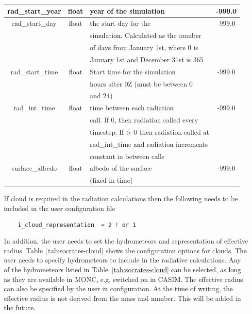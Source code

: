 \documentclass[a4paper,11pt]{article}
\begin{document}
\begin{table}[H]
\begin{tabular}{|c|c|l|c|}
\hline
  rad\_start\_year & float &year of the simulation  & -999.0 \tabularnewline
\hline
  rad\_start\_day & float & the start day for the & -999.0 \tabularnewline
   &  & simulation. Calculated as the number & \tabularnewline
   &  & of days from January 1st, where 0 is & \tabularnewline
   &  & January 1st and December 31st is 365 & \tabularnewline
\hline
  rad\_start\_time & float & Start time for the simulation & -999.0 \tabularnewline
   &  & hours after 0Z (must be between 0 & \tabularnewline
   &  & and 24) & \tabularnewline
\hline
  rad\_int\_time & float & time between each radiation & -999.0 \tabularnewline
   &  & call. If 0, then radiation called every & \tabularnewline
   &  & timestep. If > 0 then radiation called at & \tabularnewline
   &  & rad\_int\_time and radiation increments & \tabularnewline
   &  & constant in between calls & \tabularnewline
\hline
  surface\_albedo & float & albedo of the surface & -999.0 \tabularnewline
   &  & (fixed in time) & \tabularnewline
\hline
\hline
\end{tabular}
\end{table}

If cloud is required in the radiation calculations then the following needs to
be included in the user configuration file
\begin{lstlisting}
    i_cloud_representation  = 2 ! or 1
\end{lstlisting}
In addition, the user needs to set the hydrometeors and representation of
effective radius. Table~\ref{tab:socrates-cloud} shows the configuration
options for clouds. The user needs to specify hydrometeors to include in the
radiative calculations. Any of the hydrometeors listed in Table~\ref{tab:socrates-cloud}
can be selected, as long as they are available in MONC, e.g. switched on in CASIM.
The effective radius can also be specified by the user in configuration. At the
time of writing, the effective radius is not derived from the mass and number.
This will be added in the future.
\end{document}
